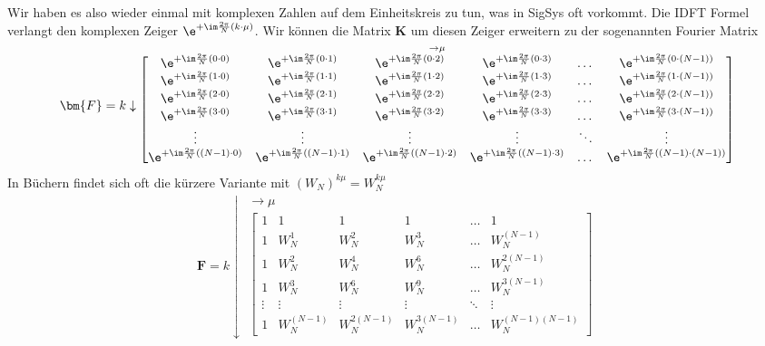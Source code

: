 Wir haben es also wieder einmal mit komplexen Zahlen auf dem Einheitskreis zu
tun, was in SigSys oft vorkommt.
%
Die IDFT Formel verlangt den komplexen Zeiger $\e^{+\im\frac{2\pi}{N} (k\cdot \mu)}$.
Wir können die Matrix $\bm{K}$ um diesen Zeiger erweitern zu der sogenannten
Fourier Matrix
\begin{align}
\bm{F} =
k \downarrow
\substack{\rightarrow \mu\\
\begin{bmatrix}
\e^{+\im\frac{2\pi}{N} (0 \cdot 0)} & \e^{+\im\frac{2\pi}{N} (0 \cdot 1)} & \e^{+\im\frac{2\pi}{N} (0 \cdot 2)} & \e^{+\im\frac{2\pi}{N} (0 \cdot 3)} & \dots & \e^{+\im\frac{2\pi}{N} (0 \cdot (N-1))}\\
\e^{+\im\frac{2\pi}{N} (1 \cdot 0)} & \e^{+\im\frac{2\pi}{N} (1 \cdot 1)} & \e^{+\im\frac{2\pi}{N} (1 \cdot 2)} & \e^{+\im\frac{2\pi}{N} (1 \cdot 3)} & \dots & \e^{+\im\frac{2\pi}{N} (1 \cdot (N-1))} \\
\e^{+\im\frac{2\pi}{N} (2 \cdot 0)} & \e^{+\im\frac{2\pi}{N} (2 \cdot 1)} & \e^{+\im\frac{2\pi}{N} (2 \cdot 2)} & \e^{+\im\frac{2\pi}{N} (2 \cdot 3)} & \dots & \e^{+\im\frac{2\pi}{N} (2 \cdot (N-1))}\\
\e^{+\im\frac{2\pi}{N} (3 \cdot 0)} & \e^{+\im\frac{2\pi}{N} (3 \cdot 1)} & \e^{+\im\frac{2\pi}{N} (3 \cdot 2)} & \e^{+\im\frac{2\pi}{N} (3 \cdot 3)} & \dots & \e^{+\im\frac{2\pi}{N} (3 \cdot (N-1))}\\
\vdots & \vdots & \vdots & \vdots & \ddots & \vdots\\
\e^{+\im\frac{2\pi}{N} ((N-1) \cdot 0)} & \e^{+\im\frac{2\pi}{N} ((N-1) \cdot 1)} & \e^{+\im\frac{2\pi}{N} ((N-1) \cdot 2)} & \e^{+\im\frac{2\pi}{N} ((N-1) \cdot 3)} & \dots &  \e^{+\im\frac{2\pi}{N} ((N-1) \cdot (N-1))}
\end{bmatrix}
}
\end{align}
In Büchern findet sich oft die kürzere Variante mit $(W_N)^{k \mu} = W_N^{k \mu}$
\begin{align}
\bm{F} =
k \downarrow
\substack{\rightarrow \mu\\
\begin{bmatrix}
1 & 1 & 1 & 1 & \dots & 1\\[1em]
1 & W_N^1 & W_N^2 & W_N^3 & \dots & W_N^{(N-1)}\\[1em]
1 & W_N^2 & W_N^4 & W_N^6 & \dots & W_N^{2(N-1)}\\[1em]
1 & W_N^3 & W_N^6 & W_N^9 & \dots & W_N^{3(N-1)}\\[1em]
\vdots & \vdots & \vdots &\vdots &\ddots & \vdots\\[1em]
1 & W_N^{(N-1)} & W_N^{2(N-1)} & W_N^{3(N-1)} & \dots & W_N^{(N-1)(N-1)}
\end{bmatrix}
}
\end{align}
